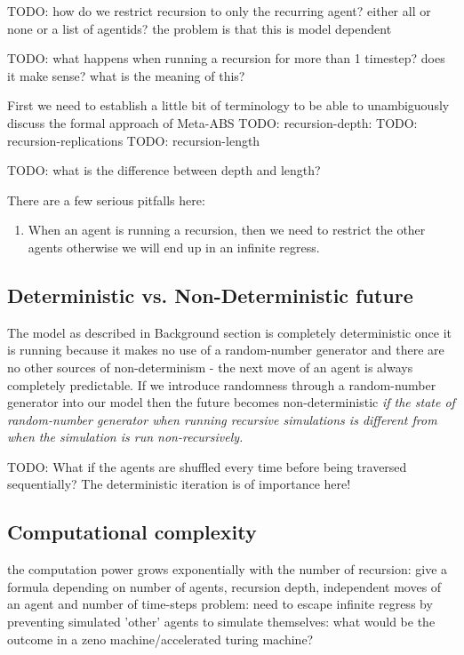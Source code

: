 TODO:  how do we restrict recursion to only the recurring agent? either all or none or a list of agentids? the problem is that this is model dependent

TODO:  what happens when running a recursion for more than 1 timestep? does it make sense? what is the meaning of this?

First we need to establish a little bit of terminology to be able to unambiguously discuss the formal approach of Meta-ABS
TODO: recursion-depth:
TODO: recursion-replications
TODO: recursion-length

TODO: what is the difference between depth and length?

There are a few serious pitfalls here: 
\begin{enumerate}
	\item When an agent is running a recursion, then we need to restrict the other agents otherwise we will end up in an infinite regress.
\end{enumerate}
	

\subsection{Deterministic vs. Non-Deterministic future}
The model as described in Background section is completely deterministic once it is running because it makes no use of a random-number generator and there are no other sources of non-determinism - the next move of an agent is always completely predictable. If we introduce randomness through a random-number generator into our model then the future becomes non-deterministic \textit{if the state of random-number generator when running recursive simulations is different from when the simulation is run non-recursively.}

TODO: What if the agents are shuffled every time before being traversed sequentially? The deterministic iteration is of importance here!

\subsection{Computational complexity}
the computation power grows exponentially with the number of recursion: give a formula depending on number of agents, recursion depth, independent moves of an agent and number of time-steps 
problem: need to escape infinite regress by preventing simulated 'other' agents to simulate themselves: what would be the outcome in a zeno machine/accelerated turing machine?

